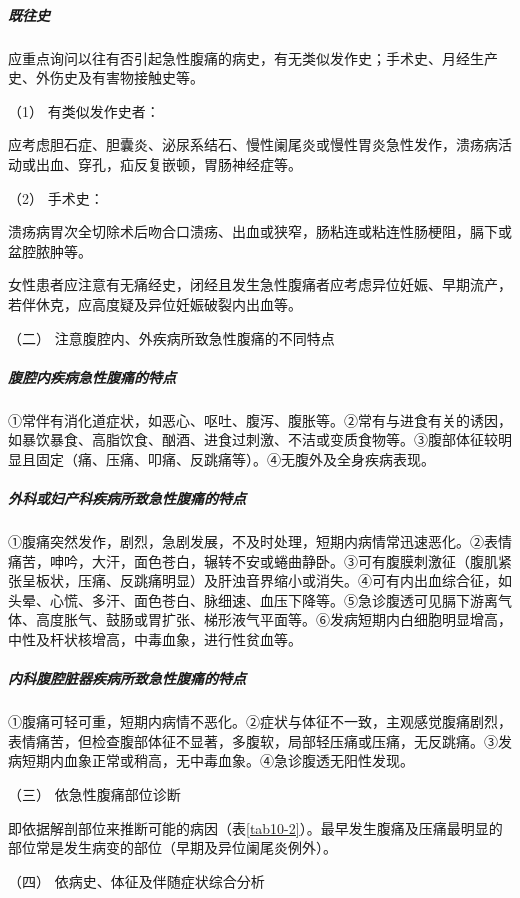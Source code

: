 \subparagraph{既往史}

应重点询问以往有否引起急性腹痛的病史，有无类似发作史；手术史、月经生产史、外伤史及有害物接触史等。

\hypertarget{text00026.htmlux5cux23CHP1-10-2-1-1-2-1}{}
（1） 有类似发作史者：

应考虑胆石症、胆囊炎、泌尿系结石、慢性阑尾炎或慢性胃炎急性发作，溃疡病活动或出血、穿孔，疝反复嵌顿，胃肠神经症等。

\hypertarget{text00026.htmlux5cux23CHP1-10-2-1-1-2-2}{}
（2） 手术史：

溃疡病胃次全切除术后吻合口溃疡、出血或狭窄，肠粘连或粘连性肠梗阻，膈下或盆腔脓肿等。

女性患者应注意有无痛经史，闭经且发生急性腹痛者应考虑异位妊娠、早期流产，若伴休克，应高度疑及异位妊娠破裂内出血等。

\hypertarget{text00026.htmlux5cux23CHP1-10-2-1-2}{}
（二） 注意腹腔内、外疾病所致急性腹痛的不同特点

\subparagraph{腹腔内疾病急性腹痛的特点}

①常伴有消化道症状，如恶心、呕吐、腹泻、腹胀等。②常有与进食有关的诱因，如暴饮暴食、高脂饮食、酗酒、进食过刺激、不洁或变质食物等。③腹部体征较明显且固定（痛、压痛、叩痛、反跳痛等）。④无腹外及全身疾病表现。

\subparagraph{外科或妇产科疾病所致急性腹痛的特点}

①腹痛突然发作，剧烈，急剧发展，不及时处理，短期内病情常迅速恶化。②表情痛苦，呻吟，大汗，面色苍白，辗转不安或蜷曲静卧。③可有腹膜刺激征（腹肌紧张呈板状，压痛、反跳痛明显）及肝浊音界缩小或消失。④可有内出血综合征，如头晕、心慌、多汗、面色苍白、脉细速、血压下降等。⑤急诊腹透可见膈下游离气体、高度胀气、鼓肠或胃扩张、梯形液气平面等。⑥发病短期内白细胞明显增高，中性及杆状核增高，中毒血象，进行性贫血等。

\subparagraph{内科腹腔脏器疾病所致急性腹痛的特点}

①腹痛可轻可重，短期内病情不恶化。②症状与体征不一致，主观感觉腹痛剧烈，表情痛苦，但检查腹部体征不显著，多腹软，局部轻压痛或压痛，无反跳痛。③发病短期内血象正常或稍高，无中毒血象。④急诊腹透无阳性发现。

\hypertarget{text00026.htmlux5cux23CHP1-10-2-1-3}{}
（三） 依急性腹痛部位诊断

即依据解剖部位来推断可能的病因（表\ref{tab10-2}）。最早发生腹痛及压痛最明显的部位常是发生病变的部位（早期及异位阑尾炎例外）。

\hypertarget{text00026.htmlux5cux23CHP1-10-2-1-4}{}
（四） 依病史、体征及伴随症状综合分析

